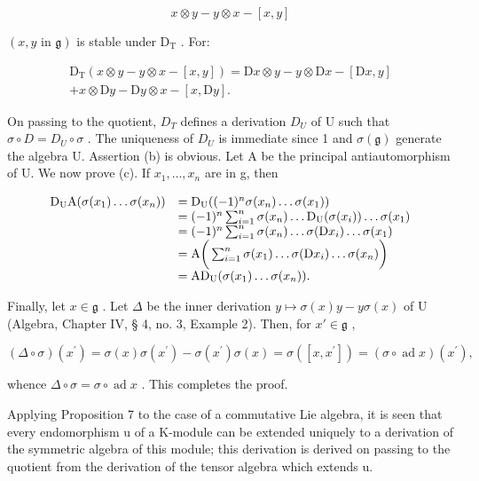 \[
x \otimes y - y \otimes x - [ x, y ]
\]

\((x,y \text{ in } \mathfrak{g})\) is stable under \(\mathrm{D}_{\mathrm{T}}\) . For:

\[
\begin{array}{r} \mathrm{D} _ {\mathrm{T}} (x \otimes y - y \otimes x - [ x, y ]) = \mathrm{D} x \otimes y - y \otimes \mathrm{D} x - [ \mathrm{D} x, y ] \\ + x \otimes \mathrm{D} y - \mathrm{D} y \otimes x - [ x, \mathrm{D} y ]. \end{array}
\]

On passing to the quotient, \(D_{T}\) defines a derivation \(D_{U}\) of U such that \(\sigma \circ D = D_{U} \circ \sigma\) . The uniqueness of \(D_{U}\) is immediate since 1 and \(\sigma(\mathfrak{g})\) generate the algebra U. Assertion (b) is obvious. Let A be the principal antiautomorphism of U. We now prove (c). If \(x_{1}, \ldots, x_{n}\) are in g, then

\[
\begin{array}{r l} \mathrm{D} _ {\mathrm{U}} \mathrm{A} (\sigma (x _ {1}) \dots \sigma (x _ {n})) & = \mathrm{D} _ {\mathrm{U}} ((- 1) ^ {n} \sigma (x _ {n}) \dots \sigma (x _ {1})) \\ & = (- 1) ^ {n} \sum_ {i = 1} ^ {n} \sigma (x _ {n}) \dots \mathrm{D} _ {\mathrm{U}} (\sigma (x _ {i})) \dots \sigma (x _ {1}) \\ & = (- 1) ^ {n} \sum_ {i = 1} ^ {n} \sigma (x _ {n}) \dots \sigma (\mathrm{D} x _ {i}) \dots \sigma (x _ {1}) \\ & = \mathrm{A} \bigg (\sum_ {i = 1} ^ {n} \sigma (x _ {1}) \dots \sigma (\mathrm{D} x _ {i}) \dots \sigma (x _ {n}) \bigg) \\ & = \mathrm{AD} _ {\mathrm{U}} (\sigma (x _ {1}) \dots \sigma (x _ {n})). \end{array}
\]

Finally, let \(x \in \mathfrak{g}\) . Let \(\Delta\) be the inner derivation \(y \mapsto \sigma(x)y - y\sigma(x)\) of U (Algebra, Chapter IV, § 4, no. 3, Example 2). Then, for \(x' \in \mathfrak{g}\) ,

\[
(\Delta \circ \sigma) (x ^ {\prime}) = \sigma (x) \sigma (x ^ {\prime}) - \sigma (x ^ {\prime}) \sigma (x) = \sigma ([ x, x ^ {\prime} ]) = (\sigma \circ \operatorname{ad} x) (x ^ {\prime}),
\]

whence \(\Delta \circ \sigma = \sigma \circ \operatorname{ad} x\) . This completes the proof.

Applying Proposition 7 to the case of a commutative Lie algebra, it is seen that every endomorphism u of a K-module can be extended uniquely to a derivation of the symmetric algebra of this module; this derivation is derived on passing to the quotient from the derivation of the tensor algebra which extends u.

